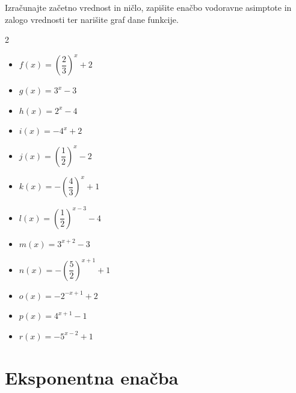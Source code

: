     \begin{naloga}
        Izračunajte začetno vrednost in ničlo, zapišite enačbo vodoravne asimptote in zalogo vrednosti ter narišite graf dane funkcije.
        \begin{multicols}{2}
            
        \begin{itemize}
            \item $f(x)=\left(\dfrac{2}{3}\right)^x+2$
            \item $g(x)=3^x-3$
            \item $h(x)=2^x-4$
            \item $i(x)=-4^x+2$
            \item $j(x)=\left(\dfrac{1}{2}\right)^x-2$
            \item $k(x)=-\left(\dfrac{4}{3}\right)^x+1$
            
            \item $l(x)=\left(\dfrac{1}{2}\right)^{x-3}-4$
            \item $m(x)=3^{x+2}-3$
            \item $n(x)=-\left(\dfrac{5}{2}\right)^{x+1}+1$
            \item $o(x)=-2^{-x+1}+2$
            \item $p(x)=4^{x+1}-1$
            \item $r(x)=-5^{x-2}+1$
        \end{itemize}
        \end{multicols}

    \end{naloga}
    

\newpage
\section{Eksponentna enačba}


\newpage

